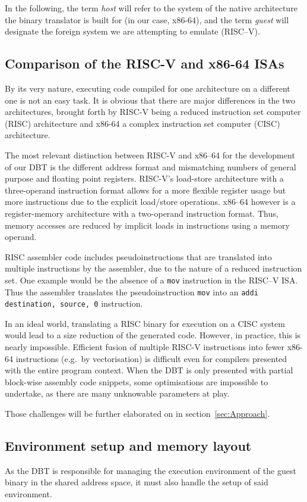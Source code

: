 In the following, the term \textit{host} will refer to the system of the native architecture the binary translator is built for (in our case, x86-64), and the term \textit{guest} will designate the foreign system we are attempting to emulate (RISC--V).

\subsection{Comparison of the RISC-V and x86-64 ISAs}
\label{sec:isa-cmp}
By its very nature, executing code compiled for one architecture on a different one is not an easy task.
It is obvious that there are major differences in the two architectures, brought forth by RISC-V being a reduced instruction set computer (RISC) architecture and x86-64 a complex instruction set computer (CISC) architecture.

The most relevant distinction between RISC-V and x86--64 for the development of our DBT is the different address format and mismatching numbers of general purpose and floating point registers.
RISC-V's load-store architecture with a three-operand instruction format allows for a more flexible register usage but more instructions due to the explicit load/store operations.
x86--64 however is a register-memory architecture with a two-operand instruction format.
Thus, memory accesses are reduced by implicit loads in instructions using a memory operand.

RISC assembler code includes pseudoinstructions that are translated into multiple instructions by the assembler, due to the nature of a reduced instruction set.
One example would be the absence of a \texttt{mov} instruction in the RISC--V ISA\@.
Thus the assembler translates the pseudoinstruction \texttt{mov} into an \texttt{addi destination, source, 0} instruction.

In an ideal world, translating a RISC binary for execution on a CISC system would lead to a size reduction of the generated code.
However, in practice, this is nearly impossible.
Efficient fusion of multiple RISC-V instructions into fewer x86-64 instructions (e.g.\ by vectorisation) is difficult even for compilers presented with the entire program context.
When the DBT is only presented with partial block-wise assembly code snippets, some optimisations are impossible to undertake, as there are many unknowable parameters at play.

Those challenges will be further elaborated on in section~\ref{sec:Approach}.

\subsection{Environment setup and memory layout}
\label{sec:memory-layout}
As the DBT is responsible for managing the execution environment of the guest binary in the shared address space, it must also handle the setup of said environment.

